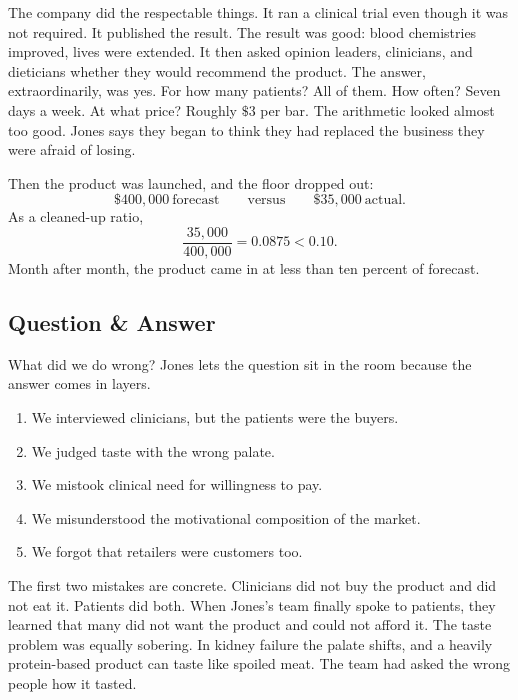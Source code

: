 The company did the respectable things. It ran a clinical trial even though it was not required. It published the result. The result was good: blood chemistries improved, lives were extended. It then asked opinion leaders, clinicians, and dieticians whether they would recommend the product. The answer, extraordinarily, was yes. For how many patients? All of them. How often? Seven days a week. At what price? Roughly \(\$3\) per bar. The arithmetic looked almost too good. Jones says they began to think they had replaced the business they were afraid of losing.

Then the product was launched, and the floor dropped out:
\begin{equation}
\$400{,}000\ \text{forecast}
\qquad \text{versus} \qquad
\$35{,}000\ \text{actual}.
\end{equation}
As a cleaned-up ratio,
\begin{equation}
\frac{35{,}000}{400{,}000}=0.0875<0.10.
\end{equation}
Month after month, the product came in at less than ten percent of forecast.

\subsection{Question \& Answer}

What did we do wrong? Jones lets the question sit in the room because the answer comes in layers.

\begin{enumerate}
\item We interviewed clinicians, but the patients were the buyers.
\item We judged taste with the wrong palate.
\item We mistook clinical need for willingness to pay.
\item We misunderstood the motivational composition of the market.
\item We forgot that retailers were customers too.
\end{enumerate}

The first two mistakes are concrete. Clinicians did not buy the product and did not eat it. Patients did both. When Jones's team finally spoke to patients, they learned that many did not want the product and could not afford it. The taste problem was equally sobering. In kidney failure the palate shifts, and a heavily protein-based product can taste like spoiled meat. The team had asked the wrong people how it tasted.


